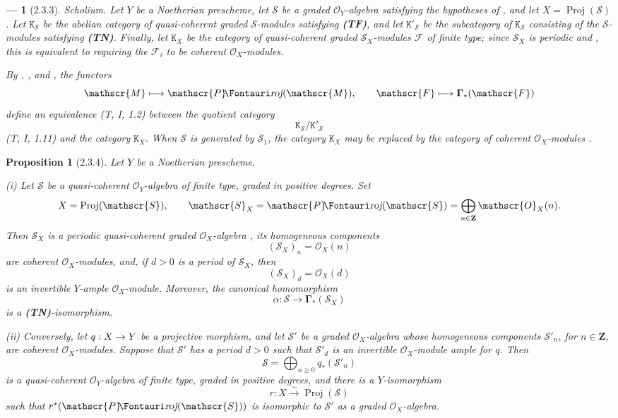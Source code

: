 \documentclass[oneside]{amsart}
\theoremstyle{ega-env-style}
\newtheorem*{env}{---}
\theoremstyle{ega-thm-env-style}
\newtheorem*{proposition}{Proposition}
\theoremstyle{ega-defn-env-style}
\def\mathcal{\mathscr}
\def\sh{\mathcal}                   %
\def\bb{\mathbf}                    %
\def\cat{\mathtt}                   %
\def\geq{\geqslant}                 %
\def\bbGamma{\boldsymbol\Gamma}
\def\Proj{\operatorname{Proj}}
\renewcommand{\to}{\mathchoice{\longrightarrow}{\rightarrow}{\rightarrow}{\rightarrow}}
\def\simto{\xrightarrow{\sim}}
\def\shProj{\sh{P}\textup{\kern-2.2pt{\Fontauri\slshape roj}}} %
\let\EGAOriginalLabel\label
\renewcommand{\label}[1]{\phantomsection\EGAOriginalLabel{#1}}
\begin{document}
\begin{env}[2.3.3]
\label{III.2.3.3}
\emph{Scholium.}
Let $Y$ be a Noetherian prescheme, let $\sh{S}$ be a graded $\sh{O}_Y$-algebra satisfying the hypotheses of , and let $X=\Proj(\sh{S})$.
Let $\cat{K}_{\sh{S}}$ be the abelian category of quasi-coherent graded $\sh{S}$-modules satisfying \textbf{(TF)}, and let $\cat{K}'_{\sh{S}}$ be the subcategory of $\cat{K}_{\sh{S}}$ consisting of the $\sh{S}$-modules satisfying \textbf{(TN)}.
Finally, let $\cat{K}_X$ be the category of quasi-coherent graded $\sh{S}_X$-modules $\sh{F}$ of finite type; since $\sh{S}_X$ is periodic  and , this is equivalent to requiring the $\sh{F}_i$ to be coherent $\sh{O}_X$-modules.

By , , and , the functors
\[
  \sh{M}\longmapsto\shProj(\sh{M}),
  \qquad
  \sh{F}\longmapsto\bbGamma_*(\sh{F})
\]
define an equivalence (T, I, 1.2) between the quotient category
\[
  \cat{K}_{\sh{S}}/\cat{K}'_{\sh{S}}
\]
(T, I, 1.11) and the category $\cat{K}_X$.
When $\sh{S}$ is generated by $\sh{S}_1$, the category $\cat{K}_X$ may be replaced by the category of coherent $\sh{O}_X$-modules .
\end{env}

\begin{proposition}[2.3.4]
\label{III.2.3.4}
Let $Y$ be a Noetherian prescheme.

(i) Let $\sh{S}$ be a quasi-coherent $\sh{O}_Y$-algebra of finite type, graded in positive degrees.
Set
\[
  X=\Proj(\sh{S}),\qquad
  \sh{S}_X=\shProj(\sh{S})
  =\bigoplus_{n\in\bb{Z}}\sh{O}_X(n).
\]
Then $\sh{S}_X$ is a periodic quasi-coherent graded $\sh{O}_X$-algebra , its homogeneous components
\[
  (\sh{S}_X)_n=\sh{O}_X(n)
\]
are coherent $\sh{O}_X$-modules, and, if $d>0$ is a period of $\sh{S}_X$, then
\[
  (\sh{S}_X)_d=\sh{O}_X(d)
\]
is an invertible $Y$-ample $\sh{O}_X$-module.
Moreover, the canonical homomorphism
\[
  \alpha:\sh{S}\longrightarrow\bbGamma_*(\sh{S}_X)
\]
is a \textbf{(TN)}-isomorphism.

(ii) Conversely, let $q:X\to Y$ be a projective morphism, and let $\sh{S}'$ be a graded $\sh{O}_X$-algebra whose homogeneous components $\sh{S}'_n$, for $n\in\bb{Z}$, are coherent $\sh{O}_X$-modules.
Suppose that $\sh{S}'$ has a period $d>0$ such that $\sh{S}'_d$ is an invertible $\sh{O}_X$-module ample for $q$.
Then
\[
  \sh{S}=\bigoplus_{n\geq0}q_*(\sh{S}'_n)
\]
is a quasi-coherent $\sh{O}_Y$-algebra of finite type, graded in positive degrees, and there is a $Y$-isomorphism
\[
  r:X\simto\Proj(\sh{S})
\]
such that $r^*(\shProj(\sh{S}))$ is isomorphic to $\sh{S}'$ as a graded $\sh{O}_X$-algebra.
\end{proposition}
\end{document}
